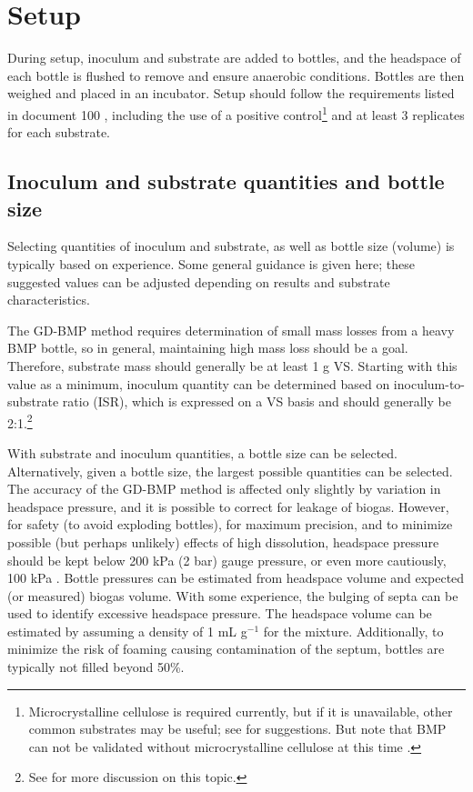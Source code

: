 \documentclass[]{article}
\begin{document}
\section{Setup}
\label{sec:setup}
During setup, inoculum and substrate are added to bottles, and the headspace of each bottle is flushed to remove  and ensure anaerobic conditions. 
Bottles are then weighed and placed in an incubator.
Setup should follow the requirements listed in document 100 \citep{BMPdoc100req}, including the use of a positive control\footnote{Microcrystalline cellulose is required currently, but if it is unavailable, other common substrates may be useful; see \citet{kochEvaluationCommonSupermarket2020} for suggestions. But note that BMP can not be validated without microcrystalline cellulose at this time \citep{BMPdoc100req}.}
and at least 3 replicates for each substrate.

\subsection{Inoculum and substrate quantities and bottle size}
\label{sec:quantities}
Selecting quantities of inoculum and substrate, as well as bottle size (volume) is typically based on experience.
Some general guidance is given here; these suggested values can be adjusted depending on results and substrate characteristics.

The GD-BMP method requires determination of small mass losses from a heavy BMP bottle, so in general, maintaining high mass loss should be a goal.
Therefore, substrate mass should generally be at least 1 g VS.
Starting with this value as a minimum, inoculum quantity can be determined based on inoculum-to-substrate ratio (ISR), which is expressed on a VS basis and should generally be 2:1.\footnote{See \citet{holligerStandardizationBiomethanePotential2016} for more discussion on this topic.}

With substrate and inoculum quantities, a bottle size can be selected.
Alternatively, given a bottle size, the largest possible quantities can be selected.
The accuracy of the GD-BMP method is affected only slightly by variation in headspace pressure, and it is possible to correct for leakage of biogas. 
However, for safety (to avoid exploding bottles), for maximum precision, and to minimize possible (but perhaps unlikely) effects of high  dissolution, headspace pressure should be kept below 200 kPa (2 bar) gauge pressure, or even more cautiously, 100 kPa \citep{hafnerSystematicErrorManometric2019}. 
Bottle pressures can be estimated from headspace volume and expected (or measured) biogas volume.
With some experience, the bulging of septa can be used to identify excessive headspace pressure.
The headspace volume can be estimated by assuming a density of 1 mL g$^{-1}$ for the mixture.
Additionally, to minimize the risk of foaming causing contamination of the septum, bottles are typically not filled beyond 50\%.
\end{document}
